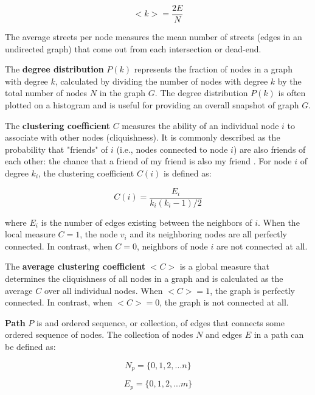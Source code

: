 \begin{equation} \label{eq:1}
<k> = \frac{2E}{N}
\end{equation}

The average streets per node measures the mean number of streets (edges in an undirected graph) that come out from each intersection or dead-end.

The \textbf{degree distribution} $P(k)$ represents the fraction of nodes in a graph with degree $k$, calculated by dividing the number of nodes with degree $k$ by the total number of nodes $N$ in the graph $G$. The degree distribution $P(k)$ is often plotted on a histogram and is useful for providing an overall snapshot of graph $G$.

The \textbf{clustering coefficient} $C$ measures the ability of an individual node $i$ to associate with other nodes (cliquishness). It is commonly described as the probability that "friends" of $i$ (i.e., nodes connected to node $i$) are also friends of each other: the chance that a friend of my friend is also my friend \cite{watts_strogatz_1998}. For node $i$ of degree $k_i$, the clustering coefficient $C(i)$ is defined as:

\begin{equation} \label{eq:2}
	C(i) = \frac{E_i}{k_i(k_i - 1)/2}
\end{equation}

where $E_i$ is the number of edges existing between the neighbors of $i$. When the local measure $C = 1$, the node $v_i$ and its neighboring nodes are all perfectly connected. In contrast, when $C = 0$, neighbors of node $i$ are not connected at all.

The \textbf{average clustering coefficient} $<C>$ is a global measure that determines the cliquishness of all nodes in a graph and is calculated as the average $C$ over all individual nodes. When $<C> = 1$, the graph is perfectly connected. In contrast, when $<C> = 0$, the graph is not connected at all.

\textbf{Path} $P$ is and ordered sequence, or collection, of edges that connects some ordered sequence of nodes. The collection of nodes $N$ and edges $E$ in a path can be defined as:

\begin{equation} \label{eq:3}
N_p = \{0,1,2,...n\}
\end{equation}

\begin{equation} \label{eq:4}
E_p = \{0,1,2,...m\}
\end{equation}

